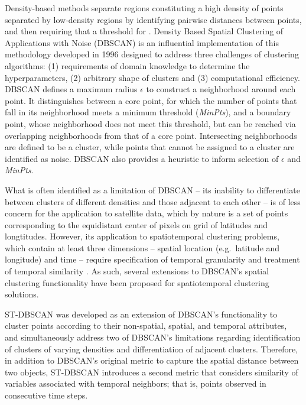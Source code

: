 Density-based methods separate regions constituting a high density of
points separated by low-density regions by identifying pairwise
distances between points, and then requiring that a threshold for
\citep{datamining2012}. Density Based Spatial Clustering of Applications
with Noise (DBSCAN) \citep{ester1996density} is an influential
implementation of this methodology developed in 1996 designed to address
three challenges of clustering algorithms: (1) requirements of domain
knowledge to determine the hyperparameters, (2) arbitrary shape of
clusters and (3) computational efficiency. DBSCAN defines a maximum
radius \(\epsilon\) to construct a neighborhood around each point. It
distinguishes between a core point, for which the number of points that
fall in its neighborhood meets a minimum threshold (\emph{MinPts}), and
a boundary point, whose neighborhood does not meet this threshold, but
can be reached via overlapping neighborhoods from that of a core point.
Intersecting neighborhoods are defined to be a cluster, while points
that cannot be assigned to a cluster are identified as noise. DBSCAN
also provides a heuristic to inform selection of \(\epsilon\) and
\emph{MinPts}.

What is often identified as a limitation of DBSCAN -- its inability to
differentiate between clusters of different densities and those adjacent
to each other \citep{stdbscan} -- is of less concern for the application
to satellite data, which by nature is a set of points corresponding to
the equidistant center of pixels on grid of latitudes and longtitudes.
However, its application to spatiotemporal clustering problems, which
contain at least three dimensions -- spatial location (e.g.~latitude and
longitude) and time -- require specification of temporal granularity and
treatment of temporal similarity \citep{kisilevich2009spatio}. As such,
several extensions to DBSCAN's spatial clustering functionality have
been proposed for spatiotemporal clustering solutions.

ST-DBSCAN \citep{stdbscan} was developed as an extension of DBSCAN's
functionality to cluster points according to their non-spatial, spatial,
and temporal attributes, and simultaneously address two of DBSCAN's
limitations regarding identification of clusters of varying densities
and differentiation of adjacent clusters. Therefore, in addition to
DBSCAN's original metric to capture the spatial distance between two
objects, ST-DBSCAN introduces a second metric that considers similarity
of variables associated with temporal neighbors; that is, points
observed in consecutive time steps.

